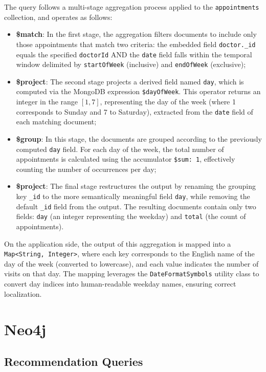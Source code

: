 The query follows a multi-stage aggregation process applied to the \texttt{appointments} collection, and operates as follows:
\begin{itemize}
	\item \textbf{\$match}: In the first stage, the aggregation filters documents to include only those appointments that match two criteria: the embedded field \texttt{doctor.\_id} equals the specified \texttt{doctorId} AND the \texttt{date} field falls within the temporal window delimited by \texttt{startOfWeek} (inclusive) and \texttt{endOfWeek} (exclusive);
	
	\item \textbf{\$project}: The second stage projects a derived field named \texttt{day}, which is computed via the MongoDB expression \texttt{\$dayOfWeek}. This operator returns an integer in the range \([1,7]\), representing the day of the week (where 1 corresponds to Sunday and 7 to Saturday), extracted from the \texttt{date} field of each matching document;
	
	\item \textbf{\$group}: In this stage, the documents are grouped according to the previously computed \texttt{day} field. For each day of the week, the total number of appointments is calculated using the accumulator \texttt{\$sum: 1}, effectively counting the number of occurrences per day;
	
	\item \textbf{\$project}: The final stage restructures the output by renaming the grouping key \texttt{\_id} to the more semantically meaningful field \texttt{day}, while removing the default \texttt{\_id} field from the output. The resulting documents contain only two fields: \texttt{day} (an integer representing the weekday) and \texttt{total} (the count of appointments).
\end{itemize}

On the application side, the output of this aggregation is mapped into a \texttt{Map<String, Integer>}, where each key corresponds to the English name of the day of the week (converted to lowercase), and each value indicates the number of visits on that day. The mapping leverages the \texttt{DateFormatSymbols} utility class to convert day indices into human-readable weekday names, ensuring correct localization.

\section{Neo4j}
\subsection{Recommendation Queries}
